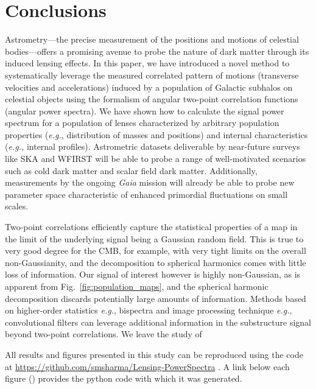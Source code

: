 \documentclass[prd,aps,10pt,nofootinbib,twocolumn,superscriptaddress,preprintnumbers,balancelastpage,longbibliography]{revtex4-1}
\begin{document}

\section{Conclusions}
\label{sec:conclusions}

Astrometry---the precise measurement of the positions and motions of celestial bodies---offers a promising avenue to probe the nature of dark matter through its induced lensing effects. In this paper, we have introduced a novel method to systematically leverage the measured correlated pattern of motions (transverse velocities and accelerations) induced by a population of Galactic subhalos on celestial objects using the formalism of angular two-point correlation functions (angular power spectra). We have shown how to calculate the signal power spectrum for a population of lenses characterized by arbitrary population properties (\emph{e.g.}, distribution of masses and positions) and internal characteristics (\emph{e.g.,} internal profiles). Astrometric datasets deliverable by near-future surveys like SKA and WFIRST will be able to probe a range of well-motivated scenarios such as cold dark matter and scalar field dark matter. Additionally, measurements by the ongoing \emph{Gaia} mission will already be able to probe new parameter space characteristic of enhanced primordial fluctuations on small scales.

Two-point correlations efficiently capture the statistical properties of a map in the limit of the underlying signal being a Gaussian random field. This is true to very good degree for the CMB, for example, with very tight limits on the overall non-Gaussianity, and the decomposition to spherical harmonics comes with little loss of information. Our signal of interest however is highly non-Gaussian, as is apparent from Fig.~\ref{fig:population_maps}, and the spherical harmonic decomposition discards potentially large amounts of information. Methods based on higher-order statistics \emph{e.g.}, bispectra and image processing technique \emph{e.g.}, convolutional filters can leverage additional information in the substructure signal beyond two-point correlations. We leave the study of 

All results and figures presented in this study can be reproduced using the code at \url{https://github.com/smsharma/Lensing-PowerSpectra} \href{https://github.com/smsharma/Lensing-PowerSpectra}{\faGithub}. A link below each figure (\faFileCodeO) provides the python code with which it was generated.
\end{document}
